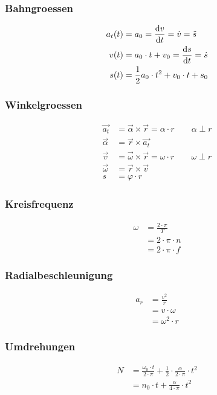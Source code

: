 \begin{multicols}{2}{}
\subsubsection{Bahngroessen}
\begin{align*}
a_t(t)&=a_0=\frac{\mathop{}\!\mathrm{d} v}{\mathop{}\!\mathrm{d} t}=\dot{v}=\ddot{s} \\
v(t)&=a_0\cdot t+v_0=\frac{\mathop{}\!\mathrm{d} s}{\mathop{}\!\mathrm{d} t}=\dot{s} \\
s(t)&=\frac{1}{2}a_0\cdot t^2+v_0\cdot t+s_0
\end{align*}


\subsubsection{Winkelgroessen}
\begin{align*}
\vec{a_t}	&=\vec{\alpha} \times \vec{r} =\alpha\cdot r \qquad \alpha \perp r \\
\vec{\alpha}	&=\vec{r} \times \vec{a_t}\\
\vec{v}		&=\vec{\omega}\times\vec{r} =\omega\cdot r  \qquad \omega \perp r\\
\vec{\omega}	&=\vec{r} \times \vec{v}\\
s		&=\varphi\cdot r  
\end{align*}
\end{multicols}        


\begin{multicols}{2}{}
\subsubsection{Kreisfrequenz}
\begin{align*}
\omega&=\frac{2\cdot\pi}{T}\\
&=2\cdot\pi\cdot n \\
&=2\cdot\pi\cdot f
\end{align*}


\subsubsection{Radialbeschleunigung}
\begin{align*}
a_r&=\frac{v^2}{r}\\
&=v\cdot\omega\\
&=\omega^2\cdot r
\end{align*}
\end{multicols}


\subsubsection{Umdrehungen}
\begin{align*}
N&=\frac{\omega_0\cdot t}{2\cdot \pi}+\frac{1}{2}\cdot\frac{\alpha}{2\cdot \pi}\cdot t^2\\
&=n_0\cdot t+\frac{\alpha}{4\cdot\pi}\cdot t^2
\end{align*}


